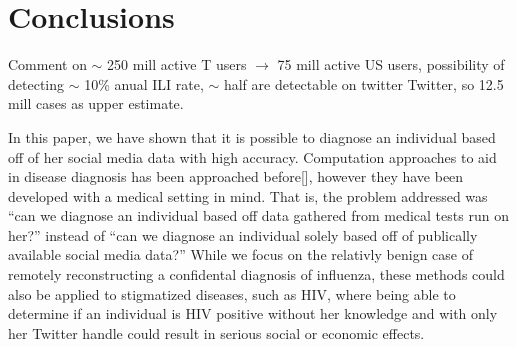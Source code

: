 \documentclass{acm_proc_article-sp}
\begin{document}
\section{Conclusions}

 

Comment on \(\sim\) 250 mill active T users \(\to\) 75 mill active US users, possibility of detecting \(\sim\) 10\% anual ILI rate, \(\sim\) half are detectable on twitter Twitter, so 12.5 mill cases as upper estimate.


In this paper, we have shown that it is possible to diagnose an individual based off of her social media data with high accuracy. Computation approaches to aid in disease diagnosis has been approached before[], however they have been developed with a medical setting in mind. That is, the problem addressed was ``can we diagnose an individual based off data gathered from medical tests run on her?'' instead of ``can we diagnose an individual solely based off of publically available social media data?''  While we focus on the relativly benign case of remotely reconstructing a confidental diagnosis of influenza, these methods could also be applied to stigmatized diseases, such as HIV, where being able to determine if an individual is HIV positive without her knowledge and with only her Twitter handle could result in serious social or economic effects.






%

%
%

\balancecolumns
\end{document}

